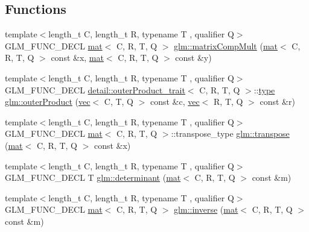 \subsection*{Functions}
\begin{DoxyCompactItemize}
\item 
{\footnotesize template$<$length\+\_\+t C, length\+\_\+t R, typename T , qualifier Q$>$ }\\G\+L\+M\+\_\+\+F\+U\+N\+C\+\_\+\+D\+E\+CL \hyperlink{structglm_1_1mat}{mat}$<$ C, R, T, Q $>$ \hyperlink{group__core__func__matrix_gaf14569404c779fedca98d0b9b8e58c1f}{glm\+::matrix\+Comp\+Mult} (\hyperlink{structglm_1_1mat}{mat}$<$ C, R, T, Q $>$ const \&x, \hyperlink{structglm_1_1mat}{mat}$<$ C, R, T, Q $>$ const \&y)
\item 
{\footnotesize template$<$length\+\_\+t C, length\+\_\+t R, typename T , qualifier Q$>$ }\\G\+L\+M\+\_\+\+F\+U\+N\+C\+\_\+\+D\+E\+CL \hyperlink{structglm_1_1detail_1_1outerProduct__trait}{detail\+::outer\+Product\+\_\+trait}$<$ C, R, T, Q $>$\+::\hyperlink{structglm_1_1type}{type} \hyperlink{group__core__func__matrix_gac29fb7bae75a8e4c1b74cbbf85520e50}{glm\+::outer\+Product} (\hyperlink{structglm_1_1vec}{vec}$<$ C, T, Q $>$ const \&c, \hyperlink{structglm_1_1vec}{vec}$<$ R, T, Q $>$ const \&r)
\item 
{\footnotesize template$<$length\+\_\+t C, length\+\_\+t R, typename T , qualifier Q$>$ }\\G\+L\+M\+\_\+\+F\+U\+N\+C\+\_\+\+D\+E\+CL \hyperlink{structglm_1_1mat}{mat}$<$ C, R, T, Q $>$\+::transpose\+\_\+type \hyperlink{group__core__func__matrix_gae679d841da8ce9dbcc6c2d454f15bc35}{glm\+::transpose} (\hyperlink{structglm_1_1mat}{mat}$<$ C, R, T, Q $>$ const \&x)
\item 
{\footnotesize template$<$length\+\_\+t C, length\+\_\+t R, typename T , qualifier Q$>$ }\\G\+L\+M\+\_\+\+F\+U\+N\+C\+\_\+\+D\+E\+CL T \hyperlink{group__core__func__matrix_gad7928795124768e058f99dce270f5c8d}{glm\+::determinant} (\hyperlink{structglm_1_1mat}{mat}$<$ C, R, T, Q $>$ const \&m)
\item 
{\footnotesize template$<$length\+\_\+t C, length\+\_\+t R, typename T , qualifier Q$>$ }\\G\+L\+M\+\_\+\+F\+U\+N\+C\+\_\+\+D\+E\+CL \hyperlink{structglm_1_1mat}{mat}$<$ C, R, T, Q $>$ \hyperlink{group__core__func__matrix_gace61e11fc177491beeca0c6971e2f3fc}{glm\+::inverse} (\hyperlink{structglm_1_1mat}{mat}$<$ C, R, T, Q $>$ const \&m)
\end{DoxyCompactItemize}


